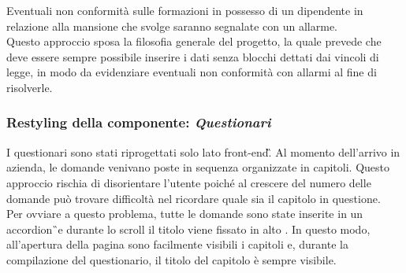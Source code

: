 Eventuali non conformità sulle formazioni in possesso di un dipendente in relazione alla mansione che svolge saranno segnalate con un allarme. \\
 Questo approccio sposa la filosofia generale del progetto, la quale prevede che deve essere sempre possibile inserire i dati senza blocchi dettati dai vincoli di legge, in modo da evidenziare eventuali non conformità con allarmi al fine di risolverle.
\newpage
\subsubsection{Restyling della componente: \textit{Questionari}}
I questionari sono stati riprogettati solo lato \gls{front-end}\G.
Al momento dell'arrivo in azienda, le domande venivano poste in sequenza organizzate in capitoli. Questo approccio rischia di disorientare l'utente poiché al crescere del numero delle domande può trovare difficoltà nel ricordare quale sia il capitolo in questione. \\
Per ovviare a questo problema, tutte le domande sono state inserite  in un \gls{accordion}\G\ e durante lo scroll il titolo viene fissato in alto . In questo modo, all'apertura della pagina sono facilmente visibili i capitoli e, durante la compilazione del questionario, il titolo del capitolo è sempre visibile.\\

